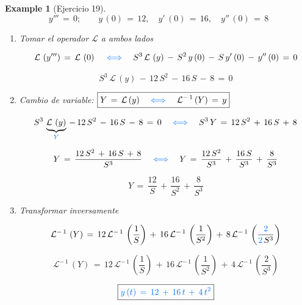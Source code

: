 \documentclass[a4paper,11pt,openany]{book}
\newtheorem{exmp}{Example}[section]
\newcommand*{\itembolasazules}[1]{%
\footnotesize\protect\tikz[baseline=-3pt]%
\protect\node[scale=.7, circle, shade, ball
color=green]{\color{white}\Large\bf#1};}
\begin{document}
\begin{exmp}[Ejercicio 19]

$$y'''\,=\,0; \qquad y\,(0)\,=\,12, \quad y'\,(0)\,=\,16, \quad y''\,(0)\,=\,8$$
 
\begin{enumerate}[label=\itembolasazules{\arabic*}]
 
\item Tomar el operador $\mathcal{L}$ a ambos lados
 
 
$$\mathcal{L}\,\left(y''' \right)\,=\,\mathcal{L}\,\left(0 \right) \quad \textcolor{brandeisblue}{\iff} \quad S^{3}\,\mathcal{L}\,\left(y \right)\,-\,S^{2}\,y\,(0)\,-\,S\,y'\,(0)\,-\,y''\,(0)\,=\,0$$
 
$$S^{3}\,\mathcal{L}\,\left(y \right)\,-\,12\,S^{2}\,-\,16\,S\,-\,8\,=\,0$$
 
\item Cambio de variable: $\boxed{Y\,=\,\mathcal{L}\,(y) \quad \textcolor{brandeisblue}{\iff} \quad \mathcal{L}^{-\,1}\,(Y)\,=\,y  }$
 
$$S^{3}\,\underbrace{\mathcal{L}\,\left(y \right)}_{\textcolor{brandeisblue}{Y} }\,-\,12\,S^{2}\,-\,16\,S\,-\,8\,=\,0 \quad \textcolor{brandeisblue}{\iff} \quad S^{3}\,Y\,=\,12\,S^{2}\,+\,16\,S\,+\,8$$
 
$$Y\,=\,\dfrac{12\,S^{2}\,+\,16\,S\,+\,8}{S^{3}} \quad \textcolor{brandeisblue}{\iff} \quad Y\,=\,\dfrac{12\,S^{2}}{S^{3}}\,+\,\dfrac{16\,S}{S^{3}}\,+\,\dfrac{8}{S^{3}} $$
 
$$Y\,=\,\dfrac{12 }{S }\,+\,\dfrac{16}{S^{2}}\,+\,\dfrac{8}{S^{3}} $$
 
\item Transformar inversamente 
 
$$\mathcal{L}^{-\,1}\,\left(Y \right)\,=\,12\,\mathcal{L}^{-\,1}\,\left(\dfrac{1}{S} \right)\,+\,16\,\mathcal{L}^{-\,1}\,\left(\dfrac{1}{S^{2}} \right)\,+\,8\,\mathcal{L}^{-\,1}\,\left(\dfrac{\textcolor{brandeisblue}{2} }{\textcolor{brandeisblue}{2}\,S^{3}} \right)  $$
 
$$\mathcal{L}^{-\,1}\,\left(Y \right)\,=\,12\,\mathcal{L}^{-\,1}\,\left(\dfrac{1}{S} \right)\,+\,16\,\mathcal{L}^{-\,1}\,\left(\dfrac{1}{S^{2}} \right)\,+\,4\,\mathcal{L}^{-\,1}\,\left(\dfrac{2}{S^{3}} \right)  $$
 
$$\boxed{\textcolor{brandeisblue}{y\,(t)\,=\,12\,+\,16\,t\,+\,4\,t^{2} } } $$
 
\end{enumerate}

\end{exmp}
 
\end{document}
